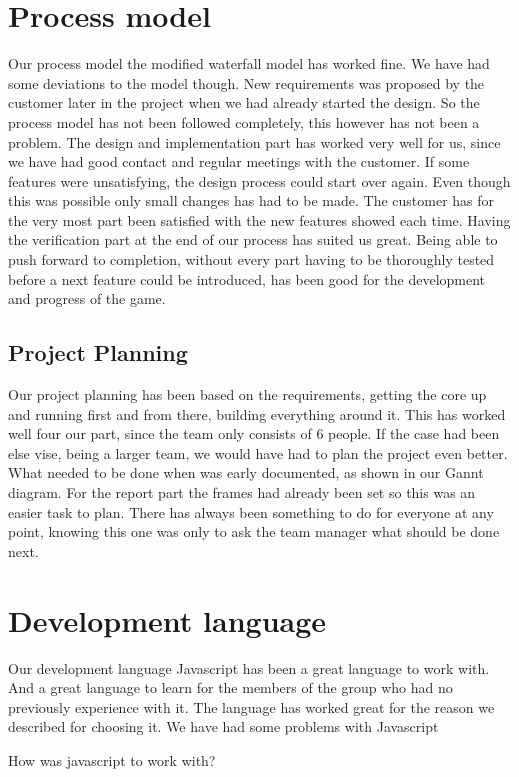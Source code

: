 \section{Process model}
Our process model the modified waterfall model has worked fine. We have had some  deviations to the model though. New requirements was proposed by the customer later in the project when we had already started the design. So the process model has not been followed completely, this however has not been a problem. The design  and implementation part has worked very well for us, since we have had good contact and regular meetings with the customer. If some features were unsatisfying, the design process could start over again. Even though this was possible only small changes has had to be made. The customer has for the very most part been satisfied with the new features showed each time. Having the verification part at the end of our process has suited us great. Being able to push forward to completion, without every part having to be thoroughly tested before a next feature could be introduced, has been good for the development and progress of the game. 
\subsection{Project Planning}
Our project planning has been based on the requirements, getting the core up and running first and from there, building everything around it. This has worked well four our part, since the team only consists of 6 people. If the case had been else vise, being a larger team, we would have had to plan the project even better. What needed to be done when was early documented, as shown in our Gannt diagram. For the report part the frames had already been set so this was an easier task to plan. There has always been something to do for everyone at any point, knowing this one was only to ask the team manager what should be done next.

\section{Development language}
Our development language Javascript has been a great language to work with. And a great language to learn for the members of the group who had no previously experience with it. The language has worked great for the reason we described for choosing it. We have had some problems with Javascript 

How was javascript to work with?


